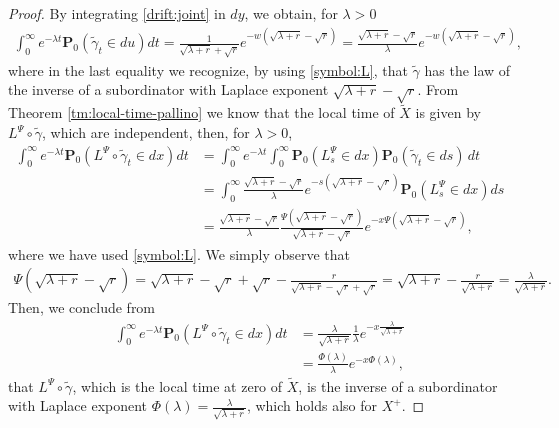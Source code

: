 \documentclass[10pt,a4paper]{amsart}
\begin{document}
\begin{proof}
	By integrating \eqref{drift:joint} in $dy$, we obtain, for $\lambda>0$
	\begin{align*}
		\int_0^\infty e^{-\lambda t} \mathbf{P}_0(\widetilde{\gamma}_t \in du)dt= \frac{1}{\sqrt{\lambda + r} + \sqrt{r}} e^{-w (\sqrt{\lambda + r} - \sqrt{r}) }=\frac{\sqrt{\lambda + r} - \sqrt{r}}{\lambda} e^{-w (\sqrt{\lambda + r} - \sqrt{r}) },
	\end{align*}
	where in the last equality we recognize, by using \eqref{symbol:L}, that $\widetilde{\gamma}$ has the law of the inverse of a subordinator with Laplace exponent $\sqrt{\lambda + r} - \sqrt{r}$. From Theorem \ref{tm:local-time-pallino} we know that the local time of $\widetilde{X}$ is given by $L^\Psi \circ \widetilde{\gamma}$, which are independent, then, for $\lambda>0$,
	\begin{align*}
		\int_0^\infty e^{-\lambda t} \mathbf{P}_0 (L^\Psi \circ \widetilde{\gamma} _ t \in dx) dt &= \int_0^\infty e^{-\lambda t} \int_0^\infty \mathbf{P}_0 (L^\Psi_s \in dx) \mathbf{P}_0(\widetilde{\gamma}_t \in ds) \, dt\\
		&= \int_0^\infty \frac{\sqrt{\lambda + r} - \sqrt{r}}{\lambda} e^{-s (\sqrt{\lambda + r} - \sqrt{r})} \mathbf{P}_0 (L^\Psi_s \in dx) ds\\
		&= \frac{\sqrt{\lambda + r} - \sqrt{r}}{\lambda}  \frac{\Psi(\sqrt{\lambda + r} - \sqrt{r})}{\sqrt{\lambda + r} - \sqrt{r}} e^{-x \Psi(\sqrt{\lambda + r} - \sqrt{r})},
	\end{align*}
	where we have used \eqref{symbol:L}.  We simply observe that
	\begin{align*}
		\Psi(\sqrt{\lambda + r} - \sqrt{r})= \sqrt{\lambda + r} - \sqrt{r} + \sqrt{r} - \frac{r}{\sqrt{\lambda + r} - \sqrt{r} + \sqrt{r}} = \sqrt{\lambda + r} - \frac{r}{\sqrt{\lambda + r}}= \frac{\lambda}{\sqrt{\lambda + r}}.
	\end{align*}
	Then, we conclude from
	\begin{align*}
		\int_0^\infty e^{-\lambda t} \mathbf{P}_0 (L^\Psi \circ \widetilde{\gamma} _ t \in dx) dt&=  \frac{\lambda}{\sqrt{\lambda + r}} \frac{1}{\lambda} e^{-x \frac{\lambda}{\sqrt{\lambda + r}}}\\
		&=  \frac{\Phi(\lambda)}{\lambda} e^{-x\Phi(\lambda)},
	\end{align*}
	that $L^\Psi \circ \widetilde{\gamma}$, which is the local time at zero of $\widetilde{X}$, is the inverse of a subordinator with Laplace exponent $\Phi(\lambda)= \frac{\lambda}{\sqrt{\lambda + r}}$, which holds also for $X^+$.
\end{proof}
\end{document}
